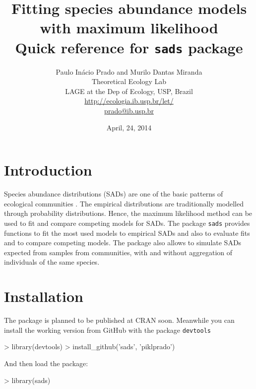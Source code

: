 \documentclass[11pt, A4]{article}
\newcommand{\code}[1]{\texttt{#1}}
\begin{document}
\title{Fitting species abundance models with maximum likelihood \\ Quick reference for \code{sads} package}
\author{Paulo Inácio Prado and  Murilo Dantas Miranda \\ Theoretical Ecology Lab \\ LAGE at the Dep of Ecology, USP, Brazil \\ 
  \url{http://ecologia.ib.usp.br/let/} \\ \url{prado@ib.usp.br}}

\date{April, 24, 2014}

\maketitle



\section{Introduction}

Species abundance distributions (SADs) are one of the basic patterns
of ecological communities \citep{McGill2007}. 
The empirical distributions are
traditionally modelled through probability distributions. Hence, the
maximum likelihood method can be used to fit and compare competing
models for SADs. 
The package \code{sads} provides functions to fit the most used models
to empirical SADs and also to evaluate fits and to compare competing
models. The package also allows to simulate SADs expected from samples
from communities, with and without aggregation of individuals of the
same species.


\section{Installation}

The package is planned to be published at CRAN soon. Meanwhile you can install the working version
from GitHub with the package \code{devtools}

\begin{Schunk}
\begin{Sinput}
> library(devtools)
> install_github('sads', 'piklprado')
\end{Sinput}
\end{Schunk}


And then load the package:

\begin{Schunk}
\begin{Sinput}
> library(sads)
\end{Sinput}
\end{Schunk}
\end{document}
